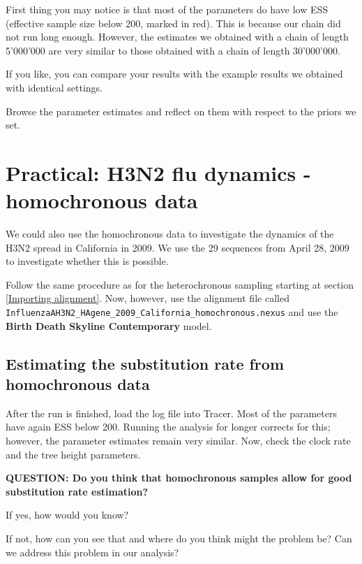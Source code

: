 \documentclass[11pt]{article}
\begin{document}
First thing you may notice is that most of the parameters do have low ESS (effective sample size below 200, marked in red). This is because our chain did not run long enough. However, the estimates we obtained with a chain of length 5'000'000 are very similar to those obtained with a chain of length 30'000'000.

\begin{framed}
If you like, you can compare your results with the example results we obtained with identical settings. %
\end{framed}

Browse the parameter estimates and reflect on them with respect to the priors we set. 



\newpage
\section{Practical: H3N2 flu dynamics - homochronous data}\label{homochronous}

We could also use the homochronous data to investigate the dynamics of the H3N2 spread in California in 2009. We use the 29 sequences from April 28, 2009 to investigate whether this is possible. 

Follow the same procedure as for the heterochronous sampling starting at section \ref{Importing alignment}. Now, however, use the alignment file called \texttt{InfluenzaAH3N2\_HAgene\_2009\_California\_homochronous.nexus} and use the \textbf{Birth Death Skyline Contemporary} model.



\bigskip
\subsection{Estimating the substitution rate from homochronous data}
After the run is finished, load the log file into Tracer. Most of the parameters have again ESS below 200. Running the analysis for longer corrects for this; however, the parameter estimates remain very similar. Now, check the clock rate and the tree height parameters. 

\begin{framed}
{\bf QUESTION: Do you think that homochronous samples allow for good substitution rate estimation? 

If yes, how would you know? 

If not, how can you see that and where do you think might the problem be? Can we address this problem in our analysis?} 
\end{framed}
\end{document}
